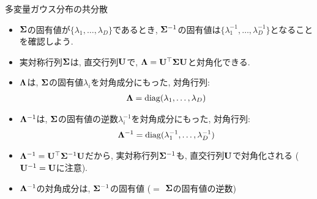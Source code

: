 \documentclass[dvipdfmx,notheorems,t]{beamer}
\begin{document}
\begin{frame}{多変量ガウス分布の共分散}
\begin{itemize}
  \item $\vb{\Sigma}$の固有値が$\{ \lambda_1, \ldots, \lambda_D \}$であるとき,
  $\vb{\Sigma}^{-1}$の固有値は$\{ \lambda_1^{-1}, \ldots, \lambda_D^{-1} \}$となることを確認しよう.
  \item 実対称行列$\vb{\Sigma}$は, 直交行列$\vb{U}$で, $\vb{\Lambda} = \vb{U}^\top \vb{\Sigma} \vb{U}$と対角化できる.
  \item $\vb{\Lambda}$は, $\vb{\Sigma}$の固有値$\lambda_i$を対角成分にもった, 対角行列:
  \begin{align*}
    \vb{\Lambda} = \operatorname{diag}(\lambda_1, \ldots, \lambda_D)
  \end{align*}
  \item $\vb{\Lambda}^{-1}$は, $\vb{\Sigma}$の固有値の逆数$\lambda_i^{-1}$を対角成分にもった, 対角行列:
  \begin{align*}
    \vb{\Lambda}^{-1} = \operatorname{diag}(\lambda_1^{-1}, \ldots, \lambda_D^{-1})
  \end{align*}
  \item $\vb{\Lambda}^{-1} = \vb{U}^\top \vb{\Sigma}^{-1} \vb{U}$だから,
  実対称行列$\vb{\Sigma}^{-1}$も, 直交行列$\vb{U}$で対角化される ($\vb{U}^{-1} = \vb{U}$に注意).
  \item $\vb{\Lambda}^{-1}$の対角成分は, $\vb{\Sigma}^{-1}$の固有値 ($=$ $\vb{\Sigma}$の固有値の逆数)
\end{itemize}
\end{frame}
\end{document}
